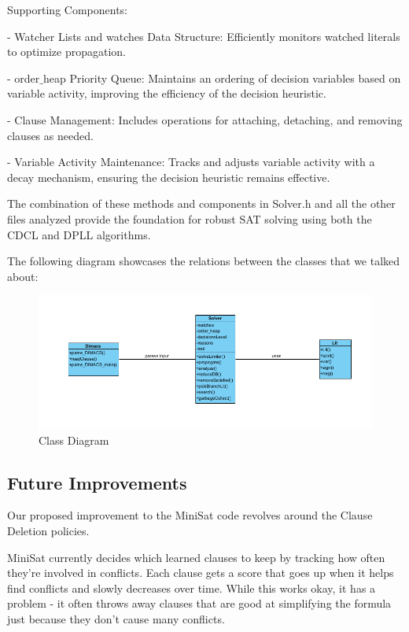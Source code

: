 \documentclass[runningheads]{llncs}
\begin{document}
Supporting Components:

- Watcher Lists and watches Data Structure: Efficiently monitors watched literals to optimize propagation.

- order$\_$heap Priority Queue: Maintains an ordering of decision variables based on variable activity, improving the efficiency of the decision heuristic.

- Clause Management: Includes operations for attaching, detaching, and removing clauses as needed.

- Variable Activity Maintenance: Tracks and adjusts variable activity with a decay mechanism, ensuring the decision heuristic remains effective.

The combination of these methods and components in Solver.h and all the other files analyzed provide the foundation for robust SAT solving using both the \ac{CDCL} and \ac{DPLL} algorithms.

The following diagram showcases the relations between the classes that we talked about:

\begin{figure}
    \centering
    \includegraphics[width=1\linewidth]{classdiagram.png}
    \caption{Class Diagram}
    \label{fig: Class Diagram}
\end{figure}

\subsection{Future Improvements}\label{Future Improvements}

Our proposed improvement to the MiniSat code revolves around the Clause Deletion policies.

MiniSat currently decides which learned clauses to keep by tracking how often they're involved in conflicts. Each clause gets a score that goes up when it helps find conflicts and slowly decreases over time. While this works okay, it has a problem - it often throws away clauses that are good at simplifying the formula just because they don't cause many conflicts.
\end{document}
